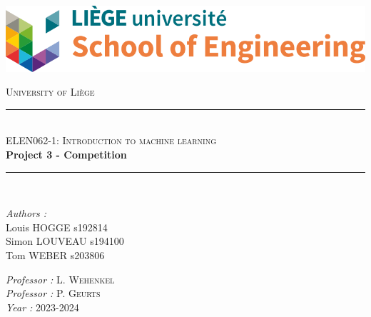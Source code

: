 \documentclass[12pt, titlepage]{article}
\newcommand{\HRule}{\rule{\linewidth}{0.5mm}}
\begin{document}
\begin{titlepage}

\begin{center}
    \vspace*{0.6cm}

    \includegraphics[scale = 2.2]{image/uliege-school-engineering.png}\\
    
    \vspace{1.5cm}
    
    \textsc{\huge University of Liège}\\[1.2cm]
    
    \HRule \\[1cm]
    
    \textsc{\LARGE ELEN062-1: Introduction to machine learning}\\[1cm]
    
    {\Huge \bfseries Project 3 - Competition}\\[1.4cm] 
    
    \HRule \\[1cm]
    
\end{center}

\begin{minipage}{0.45\linewidth}
      \begin{flushleft} \large
      
        \emph{Authors : }\\
        Louis \textsc{HOGGE}  s192814\\
        Simon \textsc{LOUVEAU}  s194100\\
        Tom \textsc{WEBER} s203806
        
      \end{flushleft}
\end{minipage}
\hfill
\begin{minipage}{0.45\linewidth}
      \begin{flushright} \large
      
        \emph{Professor : } L. \textsc{Wehenkel}\\
        \emph{Professor : } P. \textsc{Geurts}\\
        \emph{Year : } 2023-2024 
        
      \end{flushright}
\end{minipage}
\end{titlepage}
\end{document}
